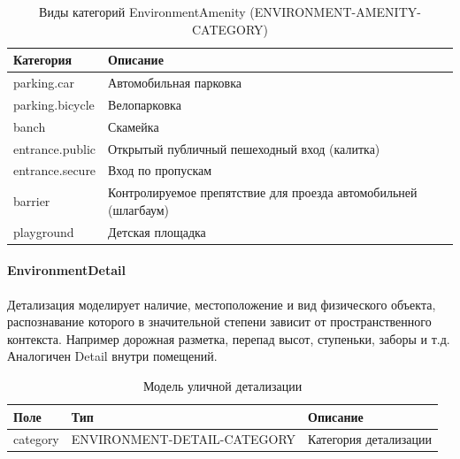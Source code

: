         \begin{center}
          \begin{xltabular}{\linewidth}{|l|X|}
            \caption{Виды категорий EnvironmentAmenity (ENVIRONMENT-AMENITY-CATEGORY)}\\           \hline
            Категория       & Описание                                                        \\\hline
            parking.car     & Автомобильная парковка                                          \\\hline
            parking.bicycle & Велопарковка                                                    \\\hline
            banch           & Скамейка                                                        \\\hline
            entrance.public & Открытый публичный пешеходный вход (калитка)                    \\\hline
            entrance.secure & Вход по пропускам                                               \\\hline
            barrier         & Контролируемое препятствие для проезда автомобильней (шлагбаум) \\\hline
            playground      & Детская площадка                                                \\\hline
          \end{xltabular}
        \end{center}

      \paragraph{EnvironmentDetail}
        Детализация моделирует наличие, местоположение и вид физического объекта, распознавание которого в значительной степени зависит от пространственного контекста. Например дорожная разметка, перепад высот, ступеньки, заборы и т.д. Аналогичен Detail внутри помещений.
        \begin{center}
          \begin{xltabular}{\linewidth}{|l|p{4cm}|X|}
            \caption{Модель уличной детализации}\\\hline
            Поле     & Тип                         & Описание              \\ \hline
            category & ENVIRONMENT-DETAIL-CATEGORY & Категория детализации \\ \hline
          \end{xltabular}
        \end{center}

